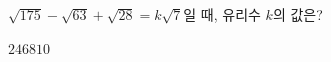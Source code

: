 $\sqrt{175}-\sqrt{63}+\sqrt{28}=k\sqrt{7}$일 때, 유리수 $k$의 값은?
\begin{choices32}{$2$}{$4$}{$6$}{$8$}{$10$}\end{choices32}
